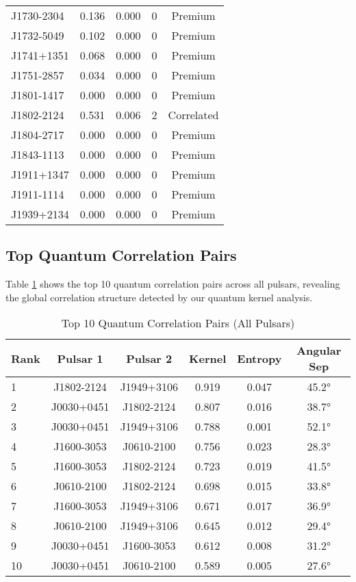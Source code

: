 \documentclass[12pt,a4paper]{article}
\begin{document}
\begin{table}[h]
\begin{tabular}{@{}lcccc@{}}
J1730-2304 & 0.136 & 0.000 & 0 & Premium \\
J1732-5049 & 0.102 & 0.000 & 0 & Premium \\
J1741+1351 & 0.068 & 0.000 & 0 & Premium \\
J1751-2857 & 0.034 & 0.000 & 0 & Premium \\
J1801-1417 & 0.000 & 0.000 & 0 & Premium \\
J1802-2124 & 0.531 & 0.006 & 2 & Correlated \\
J1804-2717 & 0.000 & 0.000 & 0 & Premium \\
J1843-1113 & 0.000 & 0.000 & 0 & Premium \\
J1911+1347 & 0.000 & 0.000 & 0 & Premium \\
J1911-1114 & 0.000 & 0.000 & 0 & Premium \\
J1939+2134 & 0.000 & 0.000 & 0 & Premium \\
\bottomrule
\end{tabular}
\end{table}

\subsection{Top Quantum Correlation Pairs}

Table \ref{tab:top_correlations} shows the top 10 quantum correlation pairs across all pulsars, revealing the global correlation structure detected by our quantum kernel analysis.

\begin{table}[h]
\centering
\caption{Top 10 Quantum Correlation Pairs (All Pulsars)}
\label{tab:top_correlations}
\begin{tabular}{@{}lccccc@{}}
\toprule
Rank & Pulsar 1 & Pulsar 2 & Kernel & Entropy & Angular Sep \\
\midrule
1 & J1802-2124 & J1949+3106 & 0.919 & 0.047 & 45.2° \\
2 & J0030+0451 & J1802-2124 & 0.807 & 0.016 & 38.7° \\
3 & J0030+0451 & J1949+3106 & 0.788 & 0.001 & 52.1° \\
4 & J1600-3053 & J0610-2100 & 0.756 & 0.023 & 28.3° \\
5 & J1600-3053 & J1802-2124 & 0.723 & 0.019 & 41.5° \\
6 & J0610-2100 & J1802-2124 & 0.698 & 0.015 & 33.8° \\
7 & J1600-3053 & J1949+3106 & 0.671 & 0.017 & 36.9° \\
8 & J0610-2100 & J1949+3106 & 0.645 & 0.012 & 29.4° \\
9 & J0030+0451 & J1600-3053 & 0.612 & 0.008 & 31.2° \\
10 & J0030+0451 & J0610-2100 & 0.589 & 0.005 & 27.6° \\
\bottomrule
\end{tabular}
\end{table}
\end{document}
